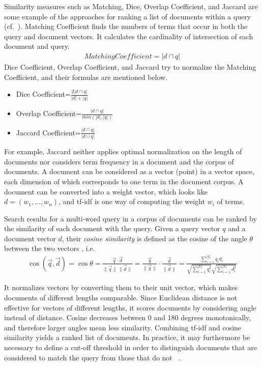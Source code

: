 \documentclass{IOS-Book-Article}
\begin{document}
Similarity measures such as Matching, Dice, Overlap Coefficient, and Jaccard are some example of the approaches for ranking a list of documents within a query (cf.~\citet{ChristopherD1999}).
Matching Coefficient finds the numbers of terms that occur in both the query and document vectors. It calculates the cardinality of intersection of each document and query.
\begin{align*}
\mathit{Matching Coefficient}=|d\cap q|
\end{align*}
Dice Coefficient, Overlap Coefficient, and Jaccard try to normalize the Matching Coefficient, and their formulas are mentioned below.
\begin{itemize}
	\item Dice Coefficient=$\frac{2|d\cap q|}{|d|+|q|}$
	\item Overlap Coefficient=$\frac{|d\cap q|}{min(|d|,|q|)}$
	\item Jaccard Coefficient=$\frac{|d\cap q|}{|d\cup q|}$
\end{itemize}
For example, Jaccard neither applies optimal normalization on the length of documents nor considers term frequency in a document and the corpus of documents.
A document can be considered as a vector (point) in a vector space, each dimension of which corresponds to one term in the document corpus. 
A document can be converted into a weight vector, which looks like $d=(w_1,\dots,w_n)$, and tf-idf is one way of computing the weight $w_i$ of terms.

Search results for a multi-word query in a corpus of documents can be ranked by the similarity of each document with the query. Given a query vector $q$ and a document vector $d$, their \emph{cosine similarity} is defined as the cosine of the angle $\theta$ between the two vectors \citep{SALTON1988,ChristopherD1999}, i.e.\
\begin{align*}
\operatorname{\cos}(\overrightarrow{q},\overrightarrow{d})=\cos \theta=\frac{\overrightarrow{q}\cdot \overrightarrow{d}}{\|\overrightarrow{q}\|\,\|\overrightarrow{d}\|}=\frac{\overrightarrow{q}}{\|\overrightarrow{q}\|}\cdot \frac{\overrightarrow{d}}{\|\overrightarrow{d}\|}=\frac{\sum_{i=1}^{|V|} q_id_i}{\sqrt{\sum_{i=1}^{|V|} q_i^2}\sqrt{\sum_{i=1}^{|V|} d_i^2}}
\end{align*}

It normalizes vectors by converting them to their unit vector, which makes documents of different lengths comparable. Since Euclidean distance is not effective for vectors of different lengths, it scores documents by considering angle instead of distance. Cosine decreases between 0 and 180 degrees monotonically, and therefore larger angles mean less similarity.
Combining tf-idf and cosine similarity yields a ranked list of documents. In practice, it may furthermore be necessary to define a cut-off threshold in order to distinguish documents that are considered to match the query from those that do not~ \citep{Joachims1997}.
\end{document}

